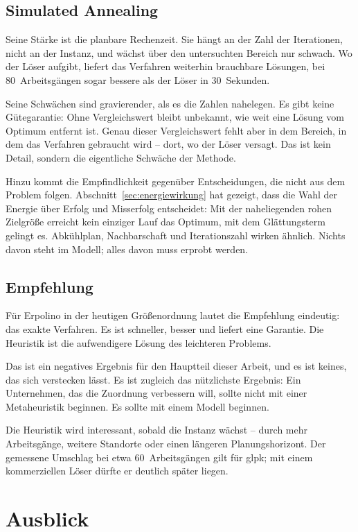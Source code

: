 \subsection{Simulated Annealing}

Seine Stärke ist die planbare Rechenzeit. Sie hängt an der Zahl der
Iterationen, nicht an der Instanz, und wächst über den untersuchten
Bereich nur schwach. Wo der Löser aufgibt, liefert das Verfahren
weiterhin brauchbare Lösungen, bei 80~Arbeitsgängen sogar bessere als
der Löser in 30~Sekunden.

Seine Schwächen sind gravierender, als es die Zahlen nahelegen. Es gibt
keine Gütegarantie: Ohne Vergleichswert bleibt unbekannt, wie weit eine
Lösung vom Optimum entfernt ist. Genau dieser Vergleichswert fehlt aber
in dem Bereich, in dem das Verfahren gebraucht wird -- dort, wo der
Löser versagt. Das ist kein Detail, sondern die eigentliche Schwäche der
Methode.

Hinzu kommt die Empfindlichkeit gegenüber Entscheidungen, die nicht aus
dem Problem folgen. Abschnitt~\ref{sec:energiewirkung} hat gezeigt, dass
die Wahl der Energie über Erfolg und Misserfolg entscheidet: Mit der
naheliegenden rohen Zielgröße erreicht kein einziger Lauf das Optimum,
mit dem Glättungsterm gelingt es. Abkühlplan, Nachbarschaft und
Iterationszahl wirken ähnlich. Nichts davon steht im Modell; alles davon
muss erprobt werden.

\subsection{Empfehlung}

Für Erpolino in der heutigen Größenordnung lautet die Empfehlung
eindeutig: das exakte Verfahren. Es ist schneller, besser und liefert
eine Garantie. Die Heuristik ist die aufwendigere Lösung des leichteren
Problems.

Das ist ein negatives Ergebnis für den Hauptteil dieser Arbeit, und es
ist keines, das sich verstecken lässt. Es ist zugleich das nützlichste
Ergebnis: Ein Unternehmen, das die Zuordnung verbessern will, sollte
nicht mit einer Metaheuristik beginnen. Es sollte mit einem Modell
beginnen.

Die Heuristik wird interessant, sobald die Instanz wächst -- durch mehr
Arbeitsgänge, weitere Standorte oder einen längeren Planungshorizont.
Der gemessene Umschlag bei etwa 60~Arbeitsgängen gilt für \ac{glpk}; mit
einem kommerziellen Löser dürfte er deutlich später liegen.

\section{Ausblick}

